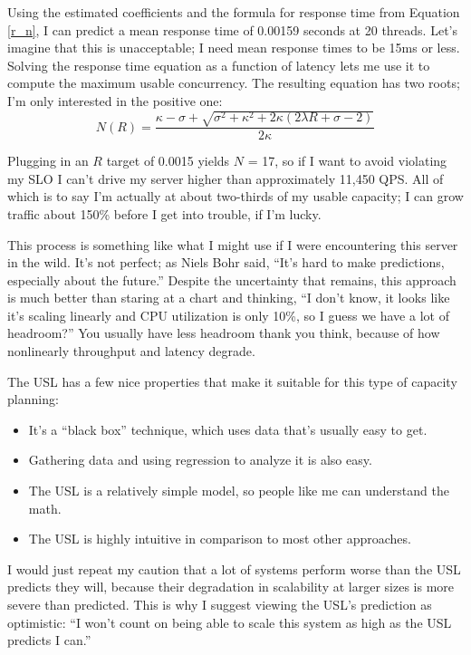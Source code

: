 \documentclass{vivid_layout}
\begin{document}
Using the estimated coefficients and the formula for response time from Equation
\ref{r_n}, I can predict a mean response time
of 0.00159 seconds at 20 threads. Let's imagine that this is unacceptable; I
need mean response times to be 15ms or less. Solving the response time equation
as a function of latency lets me use it to compute the maximum usable
concurrency. The resulting equation has two roots; I'm only interested in the
positive one:
\begin{equation}
N(R)=\frac{\kappa-\sigma+\sqrt{\sigma^2+\kappa^2+2\kappa(2\lambda R+\sigma-2)}} {2\kappa}
\label{n_r}
\end{equation}

Plugging in an $R$ target of 0.0015 yields $N$ = 17, so if I want to avoid
violating my SLO I can't drive my server higher than approximately 11,450 QPS.
All of which is to say I'm actually at about two-thirds of my usable capacity; I
can grow traffic about 150\% before I get into trouble, if I'm lucky.

This process is something like what I might use if I were encountering this
server in the wild. It's not perfect; as Niels Bohr said, ``It's hard to make
predictions, especially about the future.'' Despite the uncertainty that
remains, this approach is much better than staring at a chart and thinking, ``I
don't know, it looks like it's scaling linearly and CPU utilization is only
10\%, so I guess we have a lot of headroom?'' You usually have less headroom
thank you think, because of how nonlinearly throughput and latency degrade.

The USL has a few nice properties that make it suitable for this type of
capacity planning:

\begin{itemize}
\item It's a ``black box'' technique, which uses data that's usually easy to get.
\item Gathering data and using regression to analyze it is also easy.
\item The USL is a relatively simple model, so people like me can understand the math. 
\item The USL is highly intuitive in comparison to most other approaches.
\end{itemize}

I would just repeat my caution that a lot of systems perform worse than the USL
predicts they will, because their degradation in scalability at larger sizes is
more severe than predicted. This is why I suggest viewing the USL's prediction
as optimistic: ``I won't count on being able to scale this system as high as the
USL predicts I can.''
\end{document}
